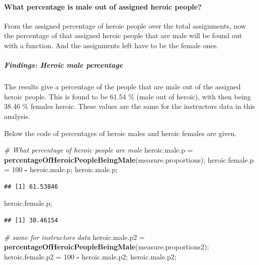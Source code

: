 \documentclass[]{article}
\newenvironment{Shaded}{\begin{snugshade}}{\end{snugshade}}
\newcommand{\CommentTok}[1]{\textcolor[rgb]{0.56,0.35,0.01}{\textit{#1}}}
\newcommand{\DecValTok}[1]{\textcolor[rgb]{0.00,0.00,0.81}{#1}}
\newcommand{\KeywordTok}[1]{\textcolor[rgb]{0.13,0.29,0.53}{\textbf{#1}}}
\newcommand{\NormalTok}[1]{#1}
\newcommand{\OperatorTok}[1]{\textcolor[rgb]{0.81,0.36,0.00}{\textbf{#1}}}
\newcommand{\StringTok}[1]{\textcolor[rgb]{0.31,0.60,0.02}{#1}}
\begin{document}
\newpage

\paragraph{What percentage is male out of assigned heroic people?}
\label{sec:appendix-heroic-proportions-percentage}

From the assigned percentage of heroic people over the total
assignments, now the percentage of that assigned heroic people that are
male will be found out with a function. And the assignments left have to
be the female ones.

\subparagraph{Findings: Heroic male percentage}
\label{sec:appendix-findings-heroic-male-percentage}

The results give a percentage of the people that are male out of the
assigned heroic people. This is found to be 61.54 \% (male out of
heroic), with then being 38.46 \% females heroic. These values are the
same for the instructors data in this analysis.

Below the code of percentages of heroic males and heroic females are
given.

\begin{Shaded}
\begin{Highlighting}[]
\CommentTok{\# What percentage of heroic people are male}
\NormalTok{heroic.male.p =}\StringTok{ }\KeywordTok{percentageOfHeroicPeopleBeingMale}\NormalTok{(measure.proportions);}
\NormalTok{heroic.female.p =}\StringTok{ }\DecValTok{100} \OperatorTok{{-}}\StringTok{ }\NormalTok{heroic.male.p;}
\NormalTok{heroic.male.p;}
\end{Highlighting}
\end{Shaded}

\begin{verbatim}
## [1] 61.53846
\end{verbatim}

\begin{Shaded}
\begin{Highlighting}[]
\NormalTok{heroic.female.p;}
\end{Highlighting}
\end{Shaded}

\begin{verbatim}
## [1] 38.46154
\end{verbatim}

\begin{Shaded}
\begin{Highlighting}[]
\CommentTok{\# same for instructors data}
\NormalTok{heroic.male.p2 =}\StringTok{ }\KeywordTok{percentageOfHeroicPeopleBeingMale}\NormalTok{(measure.proportions2);}
\NormalTok{heroic.female.p2 =}\StringTok{ }\DecValTok{100} \OperatorTok{{-}}\StringTok{ }\NormalTok{heroic.male.p2;}
\NormalTok{heroic.male.p2;}
\end{Highlighting}
\end{Shaded}
\end{document}
